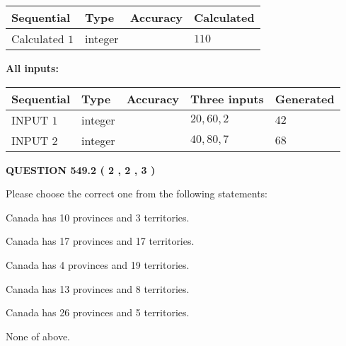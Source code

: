 \documentclass[12pt]{article}
\begin{document}
   
   
   
\noindent{}
   
   
  
  
\noindent\begin{tabular}{|l|l|l|l|}
\hline
 Sequential & Type & Accuracy & Calculated \\ 
\hline
 
 
  Calculated $  1 $ & integer &  & 
  $ 110 $ 
 \\  \hline  
 \end{tabular}
   
   
   
   
\noindent\vspace{0.1in}\hspace{-0.08in} {\textbf{\Large{All inputs: }}}
   
   
  
  
\noindent\begin{tabular}{|l|l|l|l|l|}
\hline
 Sequential & Type & Accuracy & Three inputs & Generated \\ 
\hline
 
 
  INPUT $  1 $ & integer &  & $
 20
 , 
 60
 , 
 2
 $ & $ 42 $ 
 \\  \hline  
 
 
  INPUT $  2 $ & integer &  & $
 40
 , 
 80
 , 
 7
 $ & $ 68 $ 
 \\  \hline  
 \end{tabular}
   
   
  
\vspace{0.2in}
  
{\textbf{\Large{QUESTION
549.2 
 ( 2 , 2 , 3 )
}}}
  
  
Please choose the correct one from the following statements:
 
 
Canada has 10  provinces and 3 territories.
 
 
Canada has  17 provinces and  17 territories.
 
 
Canada has   4 provinces and  19 territories.
 
 
Canada has  13 provinces and  8 territories.
 
 
Canada has  26 provinces and  5 territories.
 
 
 None of above.
 
\end{document}
